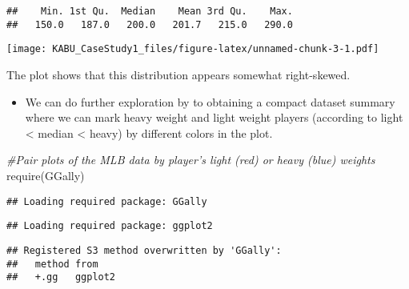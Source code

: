 \documentclass[
]{article}
\newenvironment{Shaded}{\begin{snugshade}}{\end{snugshade}}
\newcommand{\AttributeTok}[1]{\textcolor[rgb]{0.77,0.63,0.00}{#1}}
\newcommand{\CommentTok}[1]{\textcolor[rgb]{0.56,0.35,0.01}{\textit{#1}}}
\newcommand{\FunctionTok}[1]{\textcolor[rgb]{0.00,0.00,0.00}{#1}}
\newcommand{\NormalTok}[1]{#1}
\newcommand{\SpecialCharTok}[1]{\textcolor[rgb]{0.00,0.00,0.00}{#1}}
\newcommand{\StringTok}[1]{\textcolor[rgb]{0.31,0.60,0.02}{#1}}
\providecommand{\tightlist}{%
  \setlength{\itemsep}{0pt}\setlength{\parskip}{0pt}}
\begin{document}
\begin{verbatim}
##    Min. 1st Qu.  Median    Mean 3rd Qu.    Max. 
##   150.0   187.0   200.0   201.7   215.0   290.0
\end{verbatim}

\begin{Shaded}
\end{Shaded}

\texttt{[image: KABU\_CaseStudy1\_files/figure-latex/unnamed-chunk-3-1.pdf]}

The plot shows that this distribution appears somewhat right-skewed.

\begin{itemize}
\tightlist
\item
  We can do further exploration by to obtaining a compact dataset
  summary where we can mark heavy weight and light weight players
  (according to light \textless{} median \textless{} heavy) by different
  colors in the plot.
\end{itemize}

\begin{Shaded}
\begin{Highlighting}[]
\CommentTok{\#Pair plots of the MLB data by player’s light (red) or heavy (blue) weights}
\FunctionTok{require}\NormalTok{(GGally)}
\end{Highlighting}
\end{Shaded}

\begin{verbatim}
## Loading required package: GGally
\end{verbatim}

\begin{verbatim}
## Loading required package: ggplot2
\end{verbatim}

\begin{verbatim}
## Registered S3 method overwritten by 'GGally':
##   method from   
##   +.gg   ggplot2
\end{verbatim}
\end{document}
